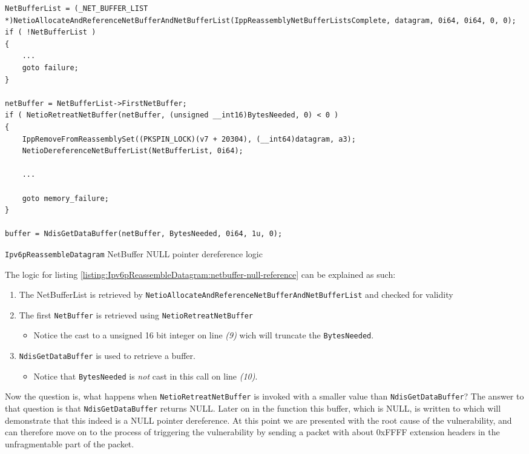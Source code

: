 \documentclass{report}
\begin{document}
\begin{listing}[H]
\begin{verbatim}
NetBufferList = (_NET_BUFFER_LIST *)NetioAllocateAndReferenceNetBufferAndNetBufferList(IppReassemblyNetBufferListsComplete, datagram, 0i64, 0i64, 0, 0);
if ( !NetBufferList )
{
    ...
    goto failure;
}

netBuffer = NetBufferList->FirstNetBuffer;
if ( NetioRetreatNetBuffer(netBuffer, (unsigned __int16)BytesNeeded, 0) < 0 )
{
    IppRemoveFromReassemblySet((PKSPIN_LOCK)(v7 + 20304), (__int64)datagram, a3);
    NetioDereferenceNetBufferList(NetBufferList, 0i64);

    ...

    goto memory_failure;
}

buffer = NdisGetDataBuffer(netBuffer, BytesNeeded, 0i64, 1u, 0);
\end{verbatim}
\caption{\texttt{Ipv6pReassembleDatagram} NetBuffer NULL pointer dereference logic}
\label{listing:Ipv6pReassembleDatagram:netbuffer-null-reference}
\end{listing}

The logic for listing \ref{listing:Ipv6pReassembleDatagram:netbuffer-null-reference} can be explained as such:
\begin{enumerate}
  \item The NetBufferList is retrieved by \texttt{NetioAllocateAndReferenceNetBufferAndNetBufferList} and checked for validity
  \item The first \texttt{NetBuffer} is retrieved using \texttt{NetioRetreatNetBuffer}
  \begin{itemize}
    \item Notice the cast to a unsigned 16 bit integer on line \emph{(9)} wich will truncate the \texttt{BytesNeeded}.
  \end{itemize}
  \item \texttt{NdisGetDataBuffer} is used to retrieve a buffer.
  \begin{itemize}
    \item Notice that \texttt{BytesNeeded} is \emph{not} cast in this call on line \emph{(10)}.
  \end{itemize}
\end{enumerate}

Now the question is, what happens when \texttt{NetioRetreatNetBuffer} is invoked with a smaller value than \texttt{NdisGetDataBuffer}? The answer to that question is that \texttt{NdisGetDataBuffer} returns NULL. Later on in the function this buffer, which is NULL, is written to which will demonstrate that this indeed is a NULL pointer dereference. At this point we are presented with the root cause of the vulnerability, and can therefore move on to the process of triggering the vulnerability by sending a packet with about 0xFFFF extension headers in the unfragmentable part of the packet.
\end{document}
